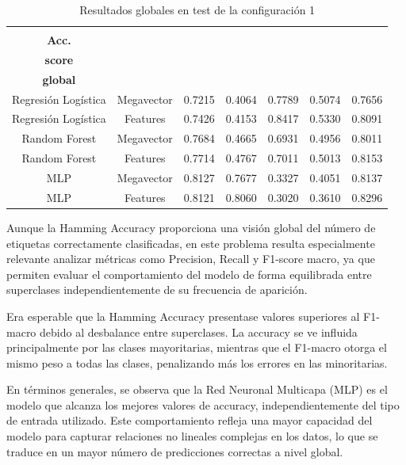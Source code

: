 \documentclass[12pt,a4paper,twoside]{book}
\begin{document}
\begin{table}[H]
	\centering
	\begin{tabular}{|c|c|c|c|c|c|c|}
	\hline
	\makecell{\textbf{Modelo}} &
	\makecell{\textbf{Entrada}} &
	\makecell{\textbf{Hamming}\\\textbf{Acc.}} &
	\makecell{\textbf{Precision}} &
	\makecell{\textbf{Recall}} &
	\makecell{\textbf{F1-}\\\textbf{score}} &
	\makecell{\textbf{AUC}\\\textbf{global}} \\
	\hline
	Regresión Logística & Megavector & 0.7215 & 0.4064 & 0.7789 & 0.5074 & 0.7656\\ 
	Regresión Logística & Features & 0.7426 & 0.4153 & 0.8417 & 0.5330 & 0.8091 \\ 

	Random Forest & Megavector & 0.7684 & 0.4665 & 0.6931 & 0.4956 & 0.8011 \\
	Random Forest & Features & 0.7714 & 0.4767 & 0.7011 & 0.5013 & 0.8153 \\ 

	MLP & Megavector & 0.8127 & 0.7677 & 0.3327 & 0.4051 & 0.8137 \\
	MLP & Features & 0.8121 & 0.8060 & 0.3020 & 0.3610 & 0.8296\\ \hline
	\end{tabular}
	\caption{Resultados globales en test de la configuración 1}
	\label{tab:resultados-globales-1}
\end{table}


Aunque la Hamming Accuracy proporciona una visión global del número de etiquetas correctamente clasificadas, en este problema resulta especialmente relevante analizar métricas como Precision, Recall y F1-score macro, ya que permiten evaluar el comportamiento del modelo de forma equilibrada entre superclases independientemente de su frecuencia de aparición.

Era esperable que la Hamming Accuracy presentase valores superiores al F1-macro debido al desbalance entre superclases. 
La accuracy se ve influida principalmente por las clases mayoritarias, mientras que el F1-macro otorga el mismo peso a todas las clases, penalizando más los errores en las minoritarias.

En términos generales, se observa que la Red Neuronal Multicapa (MLP) es el modelo que alcanza los mejores valores de accuracy, independientemente del tipo de entrada utilizado. 
Este comportamiento refleja una mayor capacidad del modelo para capturar relaciones no lineales complejas en los datos, lo que se traduce en un mayor número de predicciones correctas a nivel global.
\end{document}

